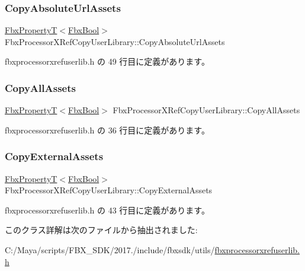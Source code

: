 \subsubsection{\texorpdfstring{Copy\+Absolute\+Url\+Assets}{CopyAbsoluteUrlAssets}}
{\footnotesize\ttfamily \hyperlink{class_fbx_property_t}{Fbx\+PropertyT}$<$\hyperlink{fbxtypes_8h_a92e0562b2fe33e76a242f498b362262e}{Fbx\+Bool}$>$ Fbx\+Processor\+X\+Ref\+Copy\+User\+Library\+::\+Copy\+Absolute\+Url\+Assets}



 fbxprocessorxrefuserlib.\+h の 49 行目に定義があります。

\mbox{\label{class_fbx_processor_x_ref_copy_user_library_aa10de06980a40ae19f01a4407fbd6b9a}} 
\subsubsection{\texorpdfstring{Copy\+All\+Assets}{CopyAllAssets}}
{\footnotesize\ttfamily \hyperlink{class_fbx_property_t}{Fbx\+PropertyT}$<$\hyperlink{fbxtypes_8h_a92e0562b2fe33e76a242f498b362262e}{Fbx\+Bool}$>$ Fbx\+Processor\+X\+Ref\+Copy\+User\+Library\+::\+Copy\+All\+Assets}



 fbxprocessorxrefuserlib.\+h の 36 行目に定義があります。

\mbox{\label{class_fbx_processor_x_ref_copy_user_library_a06e90ca77b70e7241dd57981c30c5836}} 
\subsubsection{\texorpdfstring{Copy\+External\+Assets}{CopyExternalAssets}}
{\footnotesize\ttfamily \hyperlink{class_fbx_property_t}{Fbx\+PropertyT}$<$\hyperlink{fbxtypes_8h_a92e0562b2fe33e76a242f498b362262e}{Fbx\+Bool}$>$ Fbx\+Processor\+X\+Ref\+Copy\+User\+Library\+::\+Copy\+External\+Assets}



 fbxprocessorxrefuserlib.\+h の 43 行目に定義があります。



このクラス詳解は次のファイルから抽出されました\+:\begin{DoxyCompactItemize}
\item 
C\+:/\+Maya/scripts/\+F\+B\+X\+\_\+\+S\+D\+K/2017./include/fbxsdk/utils/\hyperlink{fbxprocessorxrefuserlib_8h}{fbxprocessorxrefuserlib.\+h}\end{DoxyCompactItemize}
